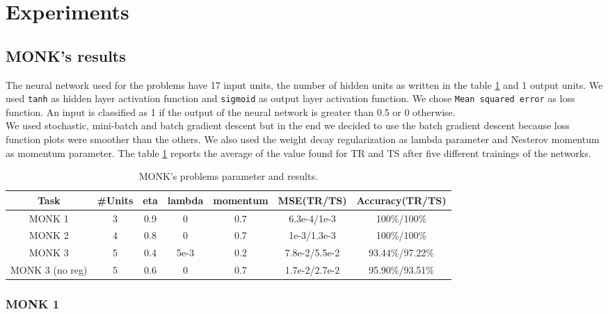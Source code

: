 \section{Experiments}


\subsection{MONK's results}

The neural network used for the problems have 17 input units, the number of hidden units as written in the table \ref{tab:dati} and 1 output units. We used \texttt{tanh} as hidden layer activation function and \texttt{sigmoid} as output layer activation function. We chose \texttt{Mean squared error} as loss function. An input is classified as 1 if the output of the neural network is greater than 0.5 or 0 otherwise.\\
We used stochastic, mini-batch and batch gradient descent but in the end we decided to use the batch gradient descent because loss function plots were smoother than the others.
We also used the weight decay regularization as lambda parameter and Nesterov momentum as momentum parameter. The table \ref{tab:dati} reports the average of the value found for TR and TS after five different trainings of the networks.    
\begin{center}
\small\addtolength{\tabcolsep}{-5pt}
\begin{table}[H]
\begin{tabular}{|c|c|c|c|c|c|c|}
\hline
\textbf{Task} &	\textbf{\#Units} &\textbf{ eta} & \textbf{lambda} &\textbf{momentum} & {\textbf{MSE(TR/TS)}} &\textbf{Accuracy(TR/TS)} \\ \hline
MONK 1        &    3 & 0.9 & 0 & 0.7  &   6.3e-4/1e-3 &   100\%/100\%  \\ \hline
MONK 2        &    4 & 0.8 & 0 & 0.7  &   1e-3/1.3e-3 &   100\%/100\% \\ \hline               
MONK 3        &    5 & 0.4 &5e-3 &0.2&     7.8e-2/5.5e-2&    93.44\%/97.22\%  \\ \hline
MONK 3 (no reg)&   5 & 0.6 &   0 &  0.7 &   1.7e-2/2.7e-2 & 95.90\%/93.51\%		\\ \hline              
\end{tabular}
\caption{MONK's problems parameter and results.}
\label{tab:dati}
\end{table}
\end{center}
\subsubsection{MONK 1}

